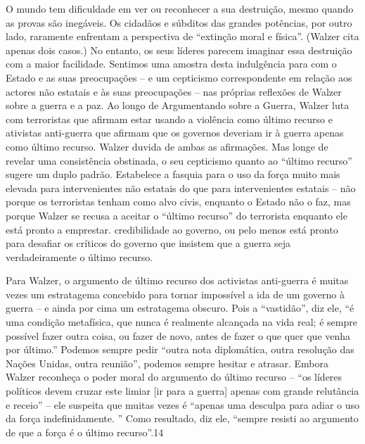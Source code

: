 O mundo tem dificuldade em ver ou reconhecer a sua destruição, mesmo quando as provas são inegáveis. Os cidadãos e súbditos das grandes potências, por outro lado, raramente enfrentam a perspectiva de “extinção moral e física”. (Walzer cita apenas dois casos.) No entanto, os seus líderes parecem imaginar essa destruição com a maior facilidade. Sentimos uma amostra desta indulgência para com o Estado e as suas preocupações – e um cepticismo correspondente em relação aos actores não estatais e às suas preocupações – nas próprias reflexões de Walzer sobre a guerra e a paz. Ao longo de Argumentando sobre a Guerra, Walzer luta com terroristas que afirmam estar usando a violência como último recurso e ativistas anti-guerra que afirmam que os governos deveriam ir à guerra apenas como último recurso. Walzer duvida de ambas as afirmações. Mas longe de revelar uma consistência obstinada, o seu cepticismo quanto ao “último recurso” sugere um duplo padrão. Estabelece a fasquia para o uso da força muito mais elevada para intervenientes não estatais do que para intervenientes estatais – não porque os terroristas tenham como alvo civis, enquanto o Estado não o faz, mas porque Walzer se recusa a aceitar o “último recurso” do terrorista enquanto ele está pronto a emprestar. credibilidade ao governo, ou pelo menos está pronto para desafiar os críticos do governo que insistem que a guerra seja verdadeiramente o último recurso.
 \par 
Para Walzer, o argumento de último recurso dos activistas anti-guerra é muitas vezes um estratagema concebido para tornar impossível a ida de um governo à guerra – e ainda por cima um estratagema obscuro. Pois a “vastidão”, diz ele, “é uma condição metafísica, que nunca é realmente alcançada na vida real; é sempre possível fazer outra coisa, ou fazer de novo, antes de fazer o que quer que venha por último.” Podemos sempre pedir “outra nota diplomática, outra resolução das Nações Unidas, outra reunião”, podemos sempre hesitar e atrasar. Embora Walzer reconheça o poder moral do argumento do último recurso – “os líderes políticos devem cruzar este limiar [ir para a guerra] apenas com grande relutância e receio” – ele suspeita que muitas vezes é “apenas uma desculpa para adiar o uso da força indefinidamente. ” Como resultado, diz ele, “sempre resisti ao argumento de que a força é o último recurso”.{\color{blue}14}
 \par 
